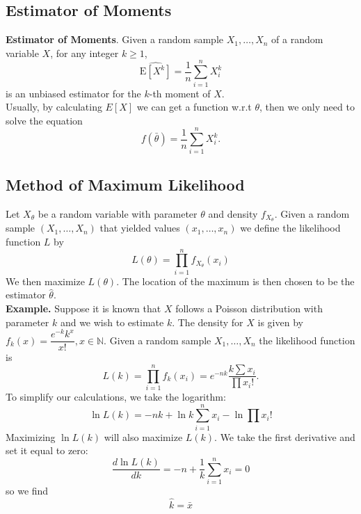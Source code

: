 \documentclass[a4paper,12pt]{article}
\begin{document}
\subsection{Estimator of Moments}
\textbf{Estimator of Moments}. Given a random sample $X_1, \ldots, X_n$ of a random variable $X$, for any integer $k \geq 1$,
\begin{equation}
\widehat{\mathrm{E}\left[X^k\right]}=\frac{1}{n} \sum_{i=1}^n X_i^k
\end{equation}
is an unbiased estimator for the $k$-th moment of $X$. \\
Usually, by calculating $E[X]$ we can get a function w.r.t $\theta$, then we only need to solve the equation
$$
f(\bar{\theta}) = \frac{1}{n} \sum_{i=1}^n X_i^k.
$$

\subsection{Method of Maximum Likelihood}
Let $X_\theta$ be a random variable with parameter $\theta$ and density $f_{X_\theta}$. Given a random sample $\left(X_1, \ldots, X_n\right)$ that yielded values $\left(x_1, \ldots, x_n\right)$ we define the likelihood function $L$ by
\begin{equation}
L(\theta)=\prod_{i=1}^n f_{X_\theta}\left(x_i\right)
\end{equation}
We then maximize $L(\theta)$. The location of the maximum is then chosen to be the estimator $\hat{\theta}$.\\
\textbf{Example.} Suppose it is known that $X$ follows a Poisson distribution with parameter $k$ and we wish to estimate $k$.
The density for $X$ is given by $f_k(x)=\dfrac{e^{-k} k^x}{x !}, x \in \mathbb{N}$. Given a random sample $X_1, \ldots, X_n$ the likelihood function is
$$
L(k)=\prod_{i=1}^n f_k\left(x_i\right)=e^{-n k} \dfrac{k \sum x_i}{\prod x_{i} !} .
$$
To simplify our calculations, we take the logarithm:
$$
\ln L(k)=-n k+\ln k \sum_{i=1}^n x_i-\ln \prod x_{i} !
$$
Maximizing $\ln L(k)$ will also maximize $L(k)$. 
We take the first derivative and set it equal to zero:
$$
\frac{d \ln L(k)}{d k}=-n+\frac{1}{k} \sum_{i=1}^n x_i=0
$$
so we find
$$
\widehat{k}=\bar{x}
$$
\end{document}
